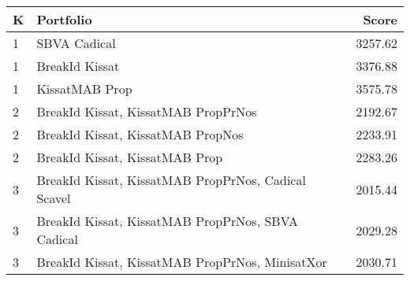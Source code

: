 \begin{tabular}{l|p{.9\linewidth}|r}
\toprule
K & Portfolio & Score \\
\midrule
1 & SBVA Cadical & 3257.62 \\
1 & BreakId Kissat & 3376.88 \\
1 & KissatMAB Prop & 3575.78 \\
2 & BreakId Kissat, KissatMAB PropPrNos & 2192.67 \\
2 & BreakId Kissat, KissatMAB PropNos & 2233.91 \\
2 & BreakId Kissat, KissatMAB Prop & 2283.26 \\
3 & BreakId Kissat, KissatMAB PropPrNos, Cadical Scavel & 2015.44 \\
3 & BreakId Kissat, KissatMAB PropPrNos, SBVA Cadical & 2029.28 \\
3 & BreakId Kissat, KissatMAB PropPrNos, MinisatXor & 2030.71 \\
\bottomrule
\end{tabular}
